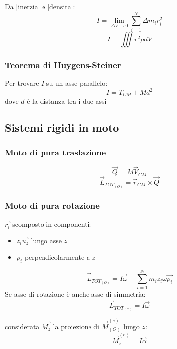 Da \eqref{inerzia} e \eqref{densita}:
\begin{equation*}
    I = \lim_{\Delta V \to 0} \sum_{i=1}^{N} \Delta m_i r_i^2
\end{equation*}
\begin{equation}
    \boxed{I = \iiint r^2 \rho dV} 
\end{equation}

\subsubsection{Teorema di Huygens-Steiner}
Per trovare $I$ su un asse parallelo:
\begin{equation}
    \boxed{I = T_{CM} + M d^2}
    \label{teoHS}
\end{equation}
dove $d$ è la distanza tra i due assi


\subsection{Sistemi rigidi in moto}
\subsubsection{Moto di pura traslazione}
\begin{equation*}
    \vec{Q} = M \vec{V}_{CM}
\end{equation*}
\begin{equation}
    \vec{L}_{TOT_{(O)}} = \vec{r}_{CM} \times \vec{Q}
\end{equation}
\subsubsection{Moto di pura rotazione}
$\vec{r_i}$ scomposto in componenti: 
\begin{itemize}
    \item $z_i \vec{u_z}$ lungo asse $z$
    \item $\rho_i$ perpendicolarmente a $z$
\end{itemize}
\begin{equation}
    \vec{L}_{TOT_{(O)}} = I \vec{\omega} - \sum_{i=1}^{N} m_i z_i \omega \vec{\rho_i}
\end{equation}
Se asse di rotazione è anche asse di simmetria:
\begin{equation}
    \boxed{\vec{L}_{TOT_{(O)}} = I \vec{\omega}}
\end{equation}

considerata $\vec{M_z}$ la proiezione di $\vec{M}_{(O)}^{(e)}$ lungo $z$:
\begin{equation}
        \boxed{\vec{M}_z^{(e)} = I \vec{\alpha}}
\end{equation}


